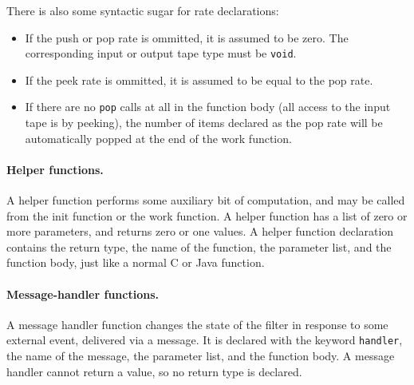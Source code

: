 \documentclass[11pt]{article}
\newcommand{\new}{\marginpar{\footnotesize \textbf{~~--~New~--}}}
\begin{document}
\noindent There is also some syntactic sugar for rate declarations:

\begin{itemize}

\item If the push or pop rate is ommitted, it is assumed to be zero.
The corresponding input or output tape type must be \lstinline|void|.

\item If the peek rate is ommitted, it is assumed to be equal to the
pop rate.

\item If there are no \lstinline|pop| calls at all in the function
body (all access to the input tape is by peeking), the number of items
declared as the pop rate will be automatically popped at the end of
the work function.

\end{itemize}

\paragraph{Helper functions.}  A helper function performs some
auxiliary bit of computation, and may be called from the init function
or the work function.  A helper function has a list of zero or more
parameters, and returns zero or one values.  A helper function
declaration contains the return type, the name of the function, the
parameter list, and the function body, just like a normal C or Java
function.

\paragraph{Message-handler functions.}  A message handler function
changes the state of the filter in response to some external event,
delivered via a message.  It is declared with the keyword
\lstinline|handler|, the name of the message, the parameter list, and
the function body.  A message handler cannot return a value, so no
return type is declared.

\end{document}
